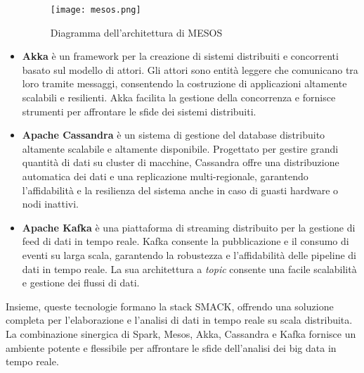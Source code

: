 \begin{itemize}
    \begin{figure}[h]
        \centering
        \texttt{[image: mesos.png]}
        \caption[Architettura MESOS]{Diagramma dell'architettura di MESOS \cite{mesos}}
    \end{figure}

    \item \textbf{Akka} è un framework per la creazione di sistemi distribuiti e concorrenti basato sul modello di attori. Gli attori sono entità leggere che comunicano tra loro tramite messaggi, consentendo la costruzione di applicazioni altamente scalabili e resilienti. Akka facilita la gestione della concorrenza e fornisce strumenti per affrontare le sfide dei sistemi distribuiti.
    \item \textbf{Apache Cassandra} è un sistema di gestione del database distribuito altamente scalabile e altamente disponibile. Progettato per gestire grandi quantità di dati su cluster di macchine, Cassandra offre una distribuzione automatica dei dati e una replicazione multi-regionale, garantendo l'affidabilità e la resilienza del sistema anche in caso di guasti hardware o nodi inattivi.
    \item \textbf{Apache Kafka} è una piattaforma di streaming distribuito per la gestione di feed di dati in tempo reale. Kafka consente la pubblicazione e il consumo di eventi su larga scala, garantendo la robustezza e l'affidabilità delle pipeline di dati in tempo reale. La sua architettura a \textit{topic} consente una facile scalabilità e gestione dei flussi di dati.
\end{itemize}

Insieme, queste tecnologie formano la stack SMACK, offrendo una soluzione completa per l'elaborazione e l'analisi di dati in tempo reale su scala distribuita.
La combinazione sinergica di Spark, Mesos, Akka, Cassandra e Kafka fornisce un ambiente potente e flessibile per affrontare le sfide dell'analisi dei big data in tempo reale.